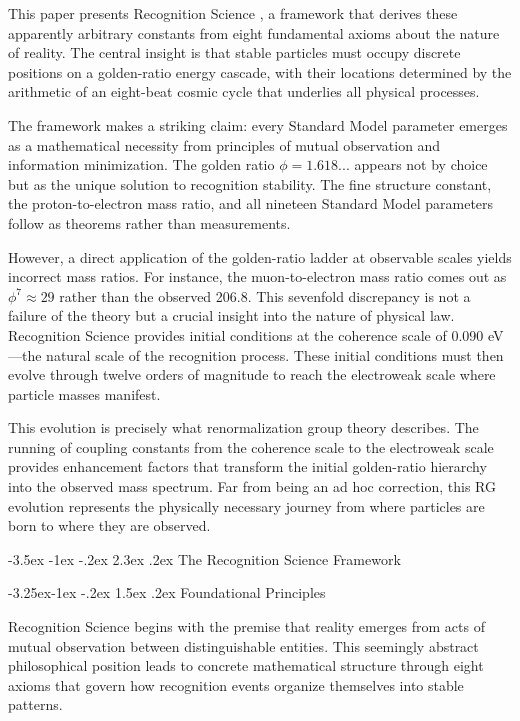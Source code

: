 \documentclass[11pt,a4paper]{article}
\makeatletter
\renewcommand\section{\@startsection{section}{1}{\z@}%
  {-3.5ex \@plus -1ex \@minus -.2ex}%
  {2.3ex \@plus.2ex}%
  {\normalfont\Large\bfseries\color{darkblue}}}
\renewcommand\subsection{\@startsection{subsection}{2}{\z@}%
  {-3.25ex\@plus -1ex \@minus -.2ex}%
  {1.5ex \@plus .2ex}%
  {\normalfont\large\bfseries\color{darkblue}}}
\theoremstyle{definition}
\makeatother
\begin{document}
This paper presents Recognition Science \cite{RS2024,source_code}, a framework that derives these apparently arbitrary constants from eight fundamental axioms about the nature of reality. The central insight is that stable particles must occupy discrete positions on a golden-ratio energy cascade, with their locations determined by the arithmetic of an eight-beat cosmic cycle that underlies all physical processes.

The framework makes a striking claim: every Standard Model parameter emerges as a mathematical necessity from principles of mutual observation and information minimization. The golden ratio $\phi = 1.618...$ appears not by choice but as the unique solution to recognition stability. The fine structure constant, the proton-to-electron mass ratio, and all nineteen Standard Model parameters follow as theorems rather than measurements.

However, a direct application of the golden-ratio ladder at observable scales yields incorrect mass ratios. For instance, the muon-to-electron mass ratio comes out as $\phi^7 \approx 29$ rather than the observed 206.8. This sevenfold discrepancy is not a failure of the theory but a crucial insight into the nature of physical law. Recognition Science provides initial conditions at the coherence scale of 0.090 eV—the natural scale of the recognition process. These initial conditions must then evolve through twelve orders of magnitude to reach the electroweak scale where particle masses manifest.

This evolution is precisely what renormalization group theory describes. The running of coupling constants from the coherence scale to the electroweak scale provides enhancement factors that transform the initial golden-ratio hierarchy into the observed mass spectrum. Far from being an ad hoc correction, this RG evolution represents the physically necessary journey from where particles are born to where they are observed.

\section{The Recognition Science Framework}

\subsection{Foundational Principles}

Recognition Science begins with the premise that reality emerges from acts of mutual observation between distinguishable entities. This seemingly abstract philosophical position leads to concrete mathematical structure through eight axioms that govern how recognition events organize themselves into stable patterns.
\end{document}
